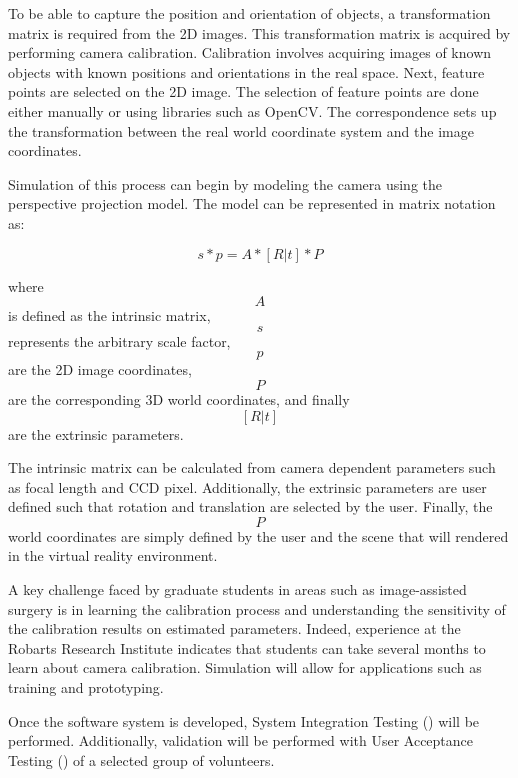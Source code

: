 \documentclass[11pt]{report}
\begin{document}
To be able to capture the position and orientation of objects, a transformation matrix is required from the 2D images. This transformation matrix is acquired by performing camera calibration. Calibration involves acquiring images of known objects with known positions and orientations in the real space. Next, feature points are selected on the 2D image. The selection of feature points are done either manually or using libraries such as OpenCV. The correspondence sets up the transformation between the real world coordinate system and the image coordinates.

Simulation of this process can begin by modeling the camera using the perspective projection model. The model can be represented in matrix notation as:

\begin{equation} s * p = A * [R|t] * P  \end{equation}
 
where  \[A\] is defined as the intrinsic matrix, \[s\] represents the arbitrary scale factor, \[p\] are the 2D image coordinates, \[P\] are the corresponding 3D world coordinates, and finally \[[R|t]\] are the extrinsic parameters.

The intrinsic matrix can be calculated from camera dependent parameters such as focal length and CCD pixel. Additionally, the extrinsic parameters are user defined such that rotation and translation are selected by the user. Finally, the \[P\] world coordinates are simply defined by the user and the scene that will rendered in the virtual reality environment. 

A key challenge faced by graduate students in areas such as image-assisted surgery is in learning the calibration process and understanding the sensitivity of the calibration results on estimated parameters. Indeed, experience at the Robarts Research Institute indicates that students can take several months to learn about camera calibration. Simulation will allow for applications such as training and prototyping. 



Once the software system is developed, System Integration Testing () will be performed. Additionally, validation will be performed with User Acceptance Testing () of a selected group of volunteers. 
\end{document}
